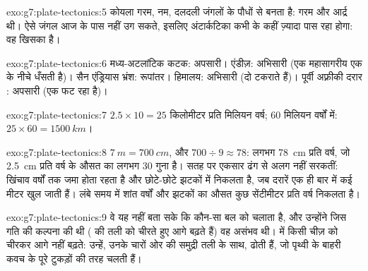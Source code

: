 \begin{solution}{exo:g7:plate-tectonics:5}
कोयला गरम, नम, दलदली जंगलों के पौधों से बनता है:  गरम और आर्द्र थी।
ऐसे जंगल आज  के पास नहीं उग सकते, इसलिए अंटार्कटिका कभी  के कहीं ज़्यादा पास रहा होगा: वह खिसका है।
\end{solution}

\begin{solution}{exo:g7:plate-tectonics:6}
मध्य-अटलांटिक कटक: अपसारी। एंडीज़: अभिसारी (एक महासागरीय  एक  के
नीचे धँसती है)। सैन एंड्रियास भ्रंश: रूपांतर। हिमालय: अभिसारी (दो 
टकराते हैं)। पूर्वी अफ़्रीकी दरार : अपसारी (एक  फट रहा है)।
\end{solution}

\begin{solution}{exo:g7:plate-tectonics:7}
$2.5 \times 10 = 25$ किलोमीटर प्रति मिलियन वर्ष; 60 मिलियन वर्षों में:
$25 \times 60 = \qty{1500}{km}$।
\end{solution}

\begin{solution}{exo:g7:plate-tectonics:8}
$\qty{7}{m} = \qty{700}{cm}$, और $700 \div 9 \approx 78$: लगभग
\qty{78}{cm} प्रति वर्ष, जो \qty{2.5}{cm} प्रति वर्ष के औसत का लगभग 30 गुना है।
सतह पर  एकसार ढंग से अलग नहीं सरकतीं: खिंचाव वर्षों तक जमा होता रहता है
और छोटे-छोटे झटकों में निकलता है, जब दरारें एक ही बार में कई मीटर खुल जाती
हैं। लंबे समय में शांत वर्षों और झटकों का औसत कुछ सेंटीमीटर प्रति वर्ष
निकलता है।
\end{solution}

\begin{solution}{exo:g7:plate-tectonics:9}
वे यह नहीं बता सके कि कौन-सा बल  को चलाता है, और उन्होंने जिस गति की
कल्पना की थी (  की तली को चीरते हुए आगे बढ़ते हैं) वह असंभव थी।
 में  किसी चीज़ को चीरकर आगे नहीं बढ़ते: उन्हें, उनके
चारों ओर की समुद्री तली के साथ,  ढोती हैं, जो पृथ्वी के बाहरी कवच के
पूरे टुकड़ों की तरह चलती हैं।
\end{solution}

